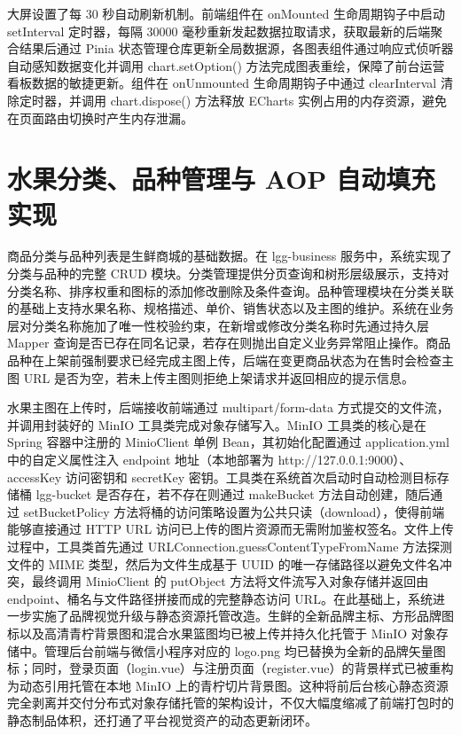 大屏设置了每 30 秒自动刷新机制。前端组件在 onMounted 生命周期钩子中启动 setInterval 定时器，每隔 30000 毫秒重新发起数据拉取请求，获取最新的后端聚合结果后通过 Pinia 状态管理仓库更新全局数据源，各图表组件通过响应式侦听器自动感知数据变化并调用 chart.setOption() 方法完成图表重绘，保障了前台运营看板数据的敏捷更新。组件在 onUnmounted 生命周期钩子中通过 clearInterval 清除定时器，并调用 chart.dispose() 方法释放 ECharts 实例占用的内存资源，避免在页面路由切换时产生内存泄漏。

\section{水果分类、品种管理与 AOP 自动填充实现}

商品分类与品种列表是生鲜商城的基础数据。在 lgg-business 服务中，系统实现了分类与品种的完整 CRUD 模块。分类管理提供分页查询和树形层级展示，支持对分类名称、排序权重和图标的添加修改删除及条件查询。品种管理模块在分类关联的基础上支持水果名称、规格描述、单价、销售状态以及主图的维护。系统在业务层对分类名称施加了唯一性校验约束，在新增或修改分类名称时先通过持久层 Mapper 查询是否已存在同名记录，若存在则抛出自定义业务异常阻止操作。商品品种在上架前强制要求已经完成主图上传，后端在变更商品状态为在售时会检查主图 URL 是否为空，若未上传主图则拒绝上架请求并返回相应的提示信息。

水果主图在上传时，后端接收前端通过 multipart/form-data 方式提交的文件流，并调用封装好的 MinIO 工具类完成对象存储写入。MinIO 工具类的核心是在 Spring 容器中注册的 MinioClient 单例 Bean，其初始化配置通过 application.yml 中的自定义属性注入 endpoint 地址（本地部署为 http://127.0.0.1:9000）、accessKey 访问密钥和 secretKey 密钥。工具类在系统首次启动时自动检测目标存储桶 lgg-bucket 是否存在，若不存在则通过 makeBucket 方法自动创建，随后通过 setBucketPolicy 方法将桶的访问策略设置为公共只读（download），使得前端能够直接通过 HTTP URL 访问已上传的图片资源而无需附加鉴权签名。文件上传过程中，工具类首先通过 URLConnection.guessContentTypeFromName 方法探测文件的 MIME 类型，然后为文件生成基于 UUID 的唯一存储路径以避免文件名冲突，最终调用 MinioClient 的 putObject 方法将文件流写入对象存储并返回由 endpoint、桶名与文件路径拼接而成的完整静态访问 URL。在此基础上，系统进一步实施了品牌视觉升级与静态资源托管改造。生鲜的全新品牌主标、方形品牌图标以及高清青柠背景图和混合水果篮图均已被上传并持久化托管于 MinIO 对象存储中。管理后台前端与微信小程序对应的 logo.png 均已替换为全新的品牌矢量图标；同时，登录页面（login.vue）与注册页面（register.vue）的背景样式已被重构为动态引用托管在本地 MinIO 上的青柠切片背景图。这种将前后台核心静态资源完全剥离并交付分布式对象存储托管的架构设计，不仅大幅度缩减了前端打包时的静态制品体积，还打通了平台视觉资产的动态更新闭环。

